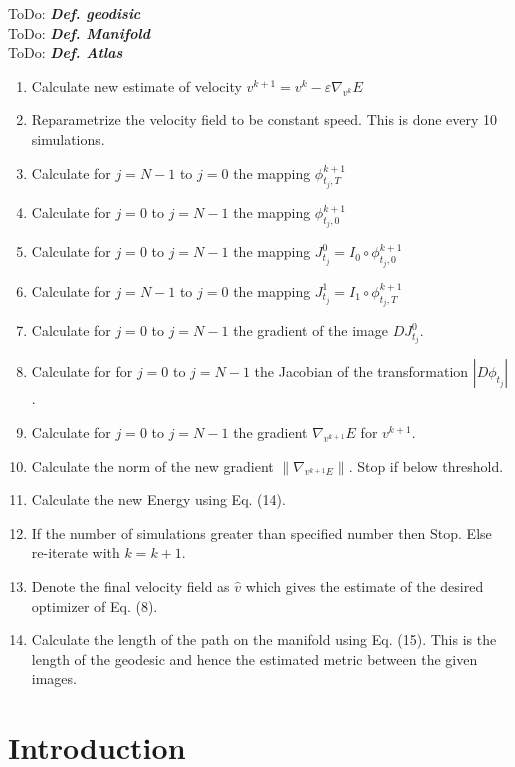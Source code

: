 \documentclass[final, paper=letter,5p,times,twocolumn]{elsarticle}
\newcommand{\ToDo}[1]{ToDo: \textbf{\textit{#1}}}
\theoremstyle{definition}
\begin{document}
\ToDo{Def. geodisic} \\
\ToDo{Def. Manifold} \\
\ToDo{Def. Atlas} \\


\begin{enumerate}
\item Calculate new estimate of velocity $v^{k+1} = v^{k} - \varepsilon \nabla_{v^{k}} E$
\item Reparametrize the velocity field to be constant speed. This is done every 10 simulations.
\item Calculate for $j = N-1$ to $j = 0$ the mapping $\phi_{t_{j},T}^{k+1}$
\item Calculate for $j = 0$ to $j = N-1$ the mapping $\phi_{t_{j},0}^{k+1}$
\item Calculate for $j = 0$ to $j = N-1$ the mapping $J_{t_{j}}^{0} = I_{0} \circ \phi_{t_{j},0}^{k+1}$
\item Calculate for $j = N-1$ to $j = 0$ the mapping $J_{t_{j}}^{1} = I_{1} \circ \phi_{t_{j},T}^{k+1}$
\item Calculate for $j = 0$ to $j = N-1$ the gradient of the image $DJ_{t_{j}}^{0}$.
\item Calculate for for $j = 0$ to $j = N-1$ the Jacobian of the transformation $|D \phi_{t_{j}}|$.
\item Calculate for $j = 0$ to $j = N-1$ the gradient $\nabla_{v^{k+1}}E$ for $v^{k+1}$.
\item Calculate the norm of the new gradient $\| \nabla_{v^{k+1}E} \|$. Stop if below threshold.
\item Calculate the new Energy using Eq. (14).
\item If the number of simulations greater than specified number then Stop. Else re-iterate with $k = k +1.$
\item Denote the final velocity field as $\hat{v}$ which gives the estimate of the desired optimizer of Eq. (8).
\item Calculate the length of the path on the manifold using Eq. (15). This is the length of the geodesic and hence the estimated metric between the given images.
\end{enumerate}



\section{Introduction}
\end{document}
